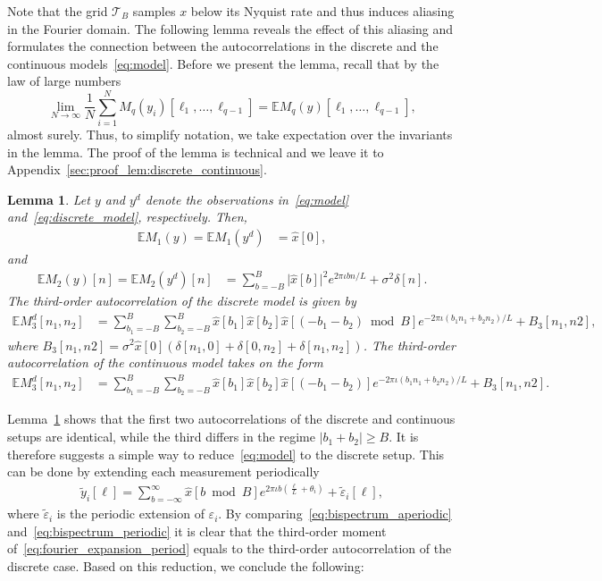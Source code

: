 \documentclass[english,12pt]{article}
\newcommand{\I}{\iota}
\newcommand{\tB}{B}
\newcommand{\E}{\mathbb{E}}
\newcommand{\T}{\mathcal{T}}
\newcommand{\TODO}[1]{{\color{red}{[#1]}}}
\numberwithin{equation}{section}
\numberwithin{thm}{section} %
\newtheorem{lemma}[thm]{Lemma}
\begin{document}
Note that the grid $\T_B$ samples $x$ below its Nyquist rate and thus induces aliasing in the Fourier domain.
The following lemma reveals the effect of this aliasing and formulates the connection between the autocorrelations in the discrete and the continuous models~\eqref{eq:model}. 
Before we present the lemma,  recall that 
by the law of large numbers 
\begin{equation}
\lim_{N\to\infty}\frac{1}{N}\sum_{i=1}^NM_q(y_i)[\ell_1,\ldots,\ell_{q-1}]
=\E M_q(y)[\ell_1,\ldots,\ell_{q-1}], 
\end{equation}
almost surely. 
Thus, to simplify notation, we take expectation over the invariants in the lemma. 
The proof of the lemma is technical and we leave it to Appendix~\ref{sec:proof_lem:discrete_continuous}.
\begin{lemma} \label{lem:discrete_continuous}
Let $y$ and $y^d$ denote the observations in~\eqref{eq:model} and~\eqref{eq:discrete_model}, respectively.
Then, 
\begin{align}
\E M_1(y) = \E M_1(y^d) &= \hat{x}[0],
\end{align}
and
\begin{align} \label{eq:power_spectrum_discrete}
\E M_2(y)[n] = \E M_2(y^d)[n] &= \sum_{b=-\tB}^{\tB}\vert \hat{x}[b]\vert ^2e^{2\pi\I bn/L} + \sigma^2\delta[n].
\end{align}
The third-order autocorrelation of the  discrete model is given by 
\begin{align} \label{eq:bispectrum_periodic}
\E M_3^d[n_1,n_2] &= \sum_{b_1=-\tB}^{\tB}\sum_{b_2=-\tB}^{\tB}\hat{x}[b_1]\hat{x}[b_2]\hat{x}[(-b_1-b_2)\bmod B]e^{-2\pi\I (b_1n_1 + b_2n_2)/L} + B_3[n_1,n2],
\end{align}
where $B_3[n_1,n2] = \sigma^2\hat{x}[0](\delta[n_1,0]+\delta[0,n_2] + \delta[n_1,n_2])$.
The third-order autocorrelation of the continuous model takes on the form 
\begin{align} \label{eq:bispectrum_aperiodic}
\E M_3^d[n_1,n_2] &= \sum_{b_1=-\tB}^{\tB}\sum_{b_2=-\tB}^{\tB}\hat{x}[b_1]\hat{x}[b_2]\hat{x}[(-b_1-b_2)]e^{-2\pi\I (b_1n_1 + b_2n_2)/L}+B_3[n_1,n2].
\end{align}
\end{lemma}

Lemma~\ref{lem:discrete_continuous} shows that the first two autocorrelations of the discrete and continuous setups are identical, while the third differs in the regime $|b_1+b_2|\geq\tB$.
It is therefore suggests a simple way to reduce~\eqref{eq:model} to the discrete setup. This can be done by extending each measurement periodically 
\begin{eqnarray} \label{eq:fourier_expansion_period}
\tilde{y}_i[\ell] = \sum_{b=-\infty}^{\infty}\hat{x}[b\bmod B]e^{2\pi\I b\left(\frac{\ell}{L}+\theta_i\right) }+ \tilde\varepsilon_i[\ell],
\end{eqnarray}
where $\tilde\varepsilon_i$ is the periodic extension of $\varepsilon_i$. \TODO{to recheck!}
By comparing~\eqref{eq:bispectrum_aperiodic} and~\eqref{eq:bispectrum_periodic} it is clear that the third-order moment of~\eqref{eq:fourier_expansion_period} equals to the third-order autocorrelation of the discrete case. Based on this reduction, we conclude the following:
\end{document}
